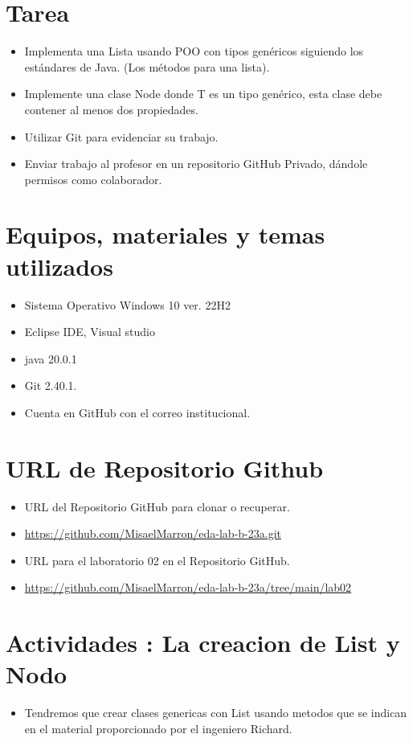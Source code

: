\documentclass{article}
\begin{document}
	\section{Tarea}
	\begin{itemize}		
		\item Implementa una Lista usando POO con tipos genéricos siguiendo los estándares de Java. (Los métodos para una lista).
		\item Implemente una clase Node donde T es un tipo genérico, esta clase debe contener al menos dos propiedades.
		\item Utilizar Git para evidenciar su trabajo.
		\item Enviar trabajo al profesor en un repositorio GitHub Privado, dándole permisos como colaborador.
	\end{itemize}
		
	\section{Equipos, materiales y temas utilizados}
	\begin{itemize}
		\item Sistema Operativo Windows 10  ver. 22H2
		\item Eclipse IDE, Visual studio
		\item java 20.0.1
		\item Git 2.40.1.
		\item Cuenta en GitHub con el correo institucional.	
	\end{itemize}
	
	\section{URL de Repositorio Github}
	\begin{itemize}
		\item URL del Repositorio GitHub para clonar o recuperar.
		\item \url{https://github.com/MisaelMarron/eda-lab-b-23a.git}
		\item URL para el laboratorio 02 en el Repositorio GitHub.
		\item \url{https://github.com/MisaelMarron/eda-lab-b-23a/tree/main/lab02}
	\end{itemize}
	
	\clearpage
	\section{Actividades  : La creacion de List y Nodo}
	\begin{itemize}
		\item Tendremos que crear clases genericas con List usando metodos que se indican en el material proporcionado por el ingeniero Richard.     
		
	\end{itemize}
	
\end{document}
